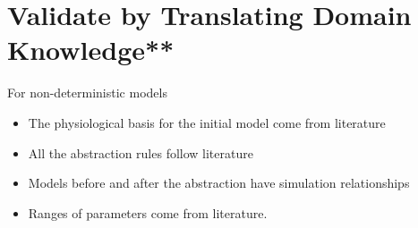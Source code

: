
\section{Validate by Translating Domain Knowledge**}
For non-deterministic models
\begin{itemize}
	\item The physiological basis for the initial model come from literature
    \item All the abstraction rules follow literature
    \item Models before and after the abstraction have simulation relationships
    \item Ranges of parameters come from literature.
\end{itemize}

 